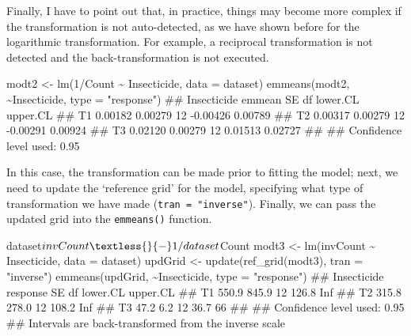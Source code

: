\documentclass[a4paper,12pt,oneside]{book}
\newenvironment{Shaded}{\begin{snugshade}}{\end{snugshade}}
\newcommand{\DecValTok}[1]{#1}
\newcommand{\SpecialCharTok}[1]{#1}
\newcommand{\StringTok}[1]{#1}
\newcommand{\DocumentationTok}[1]{#1}
\newcommand{\OtherTok}[1]{#1}
\newcommand{\FunctionTok}[1]{#1}
\newcommand{\AttributeTok}[1]{#1}
\newcommand{\NormalTok}[1]{#1}
\begin{document}
Finally, I have to point out that, in practice, things may become more complex if the transformation is not auto-detected, as we have shown before for the logarithmic transformation. For example, a reciprocal transformation is not detected and the back-transformation is not executed.

\begin{Shaded}
\begin{Highlighting}[]
\NormalTok{modt2 }\OtherTok{\textless{}{-}} \FunctionTok{lm}\NormalTok{(}\DecValTok{1}\SpecialCharTok{/}\NormalTok{Count }\SpecialCharTok{\textasciitilde{}}\NormalTok{ Insecticide, }\AttributeTok{data =}\NormalTok{ dataset)}
\FunctionTok{emmeans}\NormalTok{(modt2, }\SpecialCharTok{\textasciitilde{}}\NormalTok{Insecticide, }\AttributeTok{type =} \StringTok{"response"}\NormalTok{)}
\DocumentationTok{\#\#  Insecticide  emmean      SE df lower.CL upper.CL}
\DocumentationTok{\#\#  T1          0.00182 0.00279 12 {-}0.00426  0.00789}
\DocumentationTok{\#\#  T2          0.00317 0.00279 12 {-}0.00291  0.00924}
\DocumentationTok{\#\#  T3          0.02120 0.00279 12  0.01513  0.02727}
\DocumentationTok{\#\# }
\DocumentationTok{\#\# Confidence level used: 0.95}
\end{Highlighting}
\end{Shaded}

In this case, the transformation can be made prior to fitting the model; next, we need to update the `reference grid' for the model, specifying what type of transformation we have made (\texttt{tran\ =\ "inverse"}). Finally, we can pass the updated grid into the \texttt{emmeans()} function.

\begin{Shaded}
\begin{Highlighting}[]
\NormalTok{dataset}\SpecialCharTok{$}\NormalTok{invCount }\OtherTok{\textless{}{-}} \DecValTok{1}\SpecialCharTok{/}\NormalTok{dataset}\SpecialCharTok{$}\NormalTok{Count}
\NormalTok{modt3 }\OtherTok{\textless{}{-}} \FunctionTok{lm}\NormalTok{(invCount }\SpecialCharTok{\textasciitilde{}}\NormalTok{ Insecticide, }\AttributeTok{data =}\NormalTok{ dataset)}
\NormalTok{updGrid }\OtherTok{\textless{}{-}} \FunctionTok{update}\NormalTok{(}\FunctionTok{ref\_grid}\NormalTok{(modt3), }\AttributeTok{tran =} \StringTok{"inverse"}\NormalTok{)}
\FunctionTok{emmeans}\NormalTok{(updGrid, }\SpecialCharTok{\textasciitilde{}}\NormalTok{Insecticide, }\AttributeTok{type =} \StringTok{"response"}\NormalTok{)}
\DocumentationTok{\#\#  Insecticide response    SE df lower.CL upper.CL}
\DocumentationTok{\#\#  T1             550.9 845.9 12    126.8      Inf}
\DocumentationTok{\#\#  T2             315.8 278.0 12    108.2      Inf}
\DocumentationTok{\#\#  T3              47.2   6.2 12     36.7       66}
\DocumentationTok{\#\# }
\DocumentationTok{\#\# Confidence level used: 0.95 }
\DocumentationTok{\#\# Intervals are back{-}transformed from the inverse scale}
\end{Highlighting}
\end{Shaded}
\end{document}
